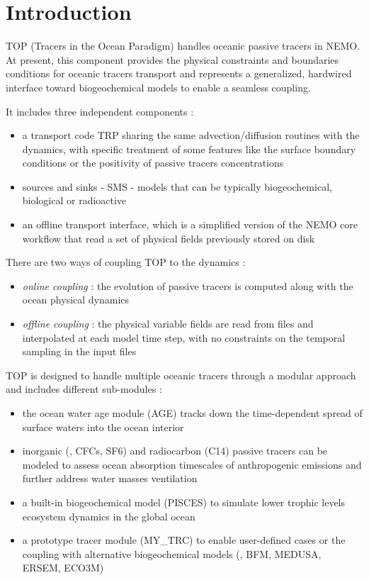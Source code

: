 
\chapter*{Introduction}

TOP (Tracers in the Ocean Paradigm) handles oceanic passive tracers in NEMO. At present, this component provides the physical constraints and boundaries conditions for oceanic tracers transport and represents a generalized, hardwired interface toward biogeochemical models to enable a seamless coupling.

It includes three independent components :

\begin{itemize}
        \item a transport code TRP sharing the same advection/diffusion routines with the dynamics, with specific treatment of some features like the surface boundary
conditions or the positivity of passive tracers concentrations
        \item sources and sinks - SMS - models that can be typically biogeochemical, biological or radioactive
        \item an offline transport interface, which is a simplified version of the NEMO core workflow that read a set of physical fields previously stored on disk
\end{itemize}

There are two ways of coupling TOP to the dynamics :

\begin{itemize}
        \item \textit{online coupling} : the evolution of passive tracers is computed along with the ocean physical dynamics
        \item \textit{offline coupling} : the physical variable fields are read from files and interpolated at each model time step, with no constraints on the temporal sampling in the input files
\end{itemize}

TOP is designed to handle multiple oceanic tracers through a modular approach and includes different sub-modules :

\begin{itemize}
        \item the ocean water age module (AGE) tracks down the time-dependent spread of surface waters into the ocean interior
        \item inorganic (\eg, CFCs, SF6) and radiocarbon (C14) passive tracers can be modeled to assess ocean absorption timescales of anthropogenic emissions and further address water masses ventilation
        \item a built-in biogeochemical model (PISCES) to simulate lower trophic levels ecosystem dynamics in the global ocean
        \item a prototype tracer module (MY\_TRC) to enable user-defined cases or the coupling with alternative biogeochemical models (\eg, BFM, MEDUSA, ERSEM, ECO3M)
\end{itemize}
